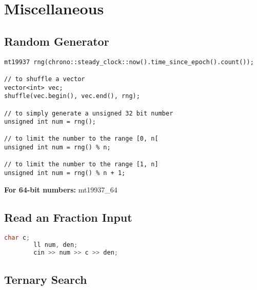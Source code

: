 \chapter{Miscellaneous}

\section{Random Generator}

\begin{lstlisting}
mt19937 rng(chrono::steady_clock::now().time_since_epoch().count());

// to shuffle a vector
vector<int> vec;
shuffle(vec.begin(), vec.end(), rng);

// to simply generate a unsigned 32 bit number
unsigned int num = rng();

// to limit the number to the range [0, n[
unsigned int num = rng() % n;

// to limit the number to the range [1, n]
unsigned int num = rng() % n + 1;
\end{lstlisting}

\textbf{For 64-bit numbers:} mt19937\_64

\section{Read an Fraction Input}

    \begin{lstlisting}[language=c++]
        char c;
        ll num, den;
        cin >> num >> c >> den;
    \end{lstlisting}
    

\section{Ternary Search}

